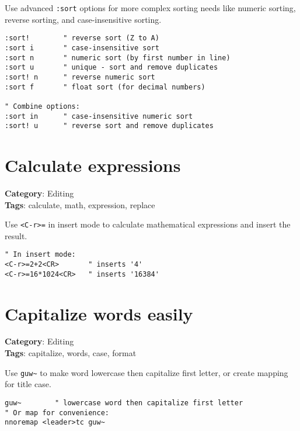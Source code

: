 {{{{Use advanced {\footnotesize \Verb§:sort§} options for more complex sorting needs like numeric sorting, reverse sorting, and case-insensitive sorting.

\begin{Exa*}{}
\begin{Verbatim}[fontsize=\footnotesize, breaklines, breakanywhere]
:sort!        " reverse sort (Z to A)
:sort i       " case-insensitive sort
:sort n       " numeric sort (by first number in line)
:sort u       " unique - sort and remove duplicates
:sort! n      " reverse numeric sort
:sort f       " float sort (for decimal numbers)

" Combine options:
:sort in      " case-insensitive numeric sort
:sort! u      " reverse sort and remove duplicates
\end{Verbatim}
\end{Exa*}

\section{Calculate expressions}

\textbf{Category}: Editing\\ \textbf{Tags}: calculate, math, expression, replace
\vspace{0.5cm}

Use {\footnotesize \Verb§<C-r>=§} in insert mode to calculate mathematical expressions and insert the result.

\begin{Exa*}{}
\begin{Verbatim}[fontsize=\footnotesize, breaklines, breakanywhere]
" In insert mode:
<C-r>=2+2<CR>       " inserts '4'
<C-r>=16*1024<CR>   " inserts '16384'
\end{Verbatim}
\end{Exa*}

\section{Capitalize words easily}

\textbf{Category}: Editing\\ \textbf{Tags}: capitalize, words, case, format
\vspace{0.5cm}

Use {\footnotesize \Verb§guw~§} to make word lowercase then capitalize first letter, or create mapping for title case.

\begin{Exa*}{}
\begin{Verbatim}[fontsize=\footnotesize, breaklines, breakanywhere]
guw~        " lowercase word then capitalize first letter
" Or map for convenience:
nnoremap <leader>tc guw~
\end{Verbatim}
\end{Exa*}

}}}}
